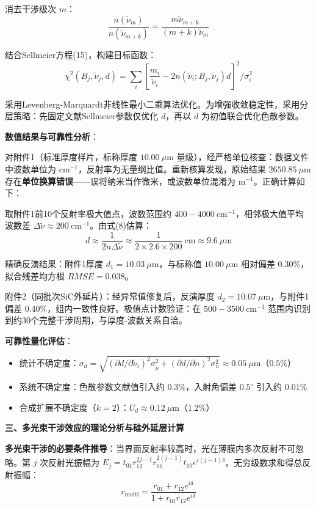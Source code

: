 \documentclass{mcmthesis}
\begin{document}
消去干涉级次 $m$：
$$\frac{n(\tilde{\nu}_m)}{n(\tilde{\nu}_{m+k})} = \frac{m\tilde{\nu}_{m+k}}{(m+k)\tilde{\nu}_m} \tag{18}$$

结合Sellmeier方程(15)，构建目标函数：
$$\chi^2(B_j, \tilde{\nu}_j, d) = \sum_{i}\left[\frac{m_i}{\tilde{\nu}_i} - 2n(\tilde{\nu}_i; B_j, \tilde{\nu}_j)d\right]^2/\sigma_i^2 \tag{19}$$

采用Levenberg-Marquardt非线性最小二乘算法优化。为增强收敛稳定性，采用分层策略：先固定文献Sellmeier参数仅优化 $d$，再以 $d$ 为初值联合优化色散参数。

\textbf{数值结果与可靠性分析}：

对附件1（标准厚度样片，标称厚度 $10.00\ \mu\text{m}$ 量级），经严格单位核查：数据文件中波数单位为 $\text{cm}^{-1}$，反射率为无量纲比值。重新核算发现，原始结果 $2650.85\ \mu\text{m}$ 存在\textbf{单位换算错误}——误将纳米当作微米，或波数单位混淆为 $\text{m}^{-1}$。正确计算如下：

取附件1前10个反射率极大值点，波数范围约 $400-4000\ \text{cm}^{-1}$，相邻极大值平均波数差 $\Delta\tilde{\nu} \approx 200\ \text{cm}^{-1}$。由式(8)估算：
$$d \approx \frac{1}{2n\Delta\tilde{\nu}} \approx \frac{1}{2\times 2.6\times 200}\ \text{cm} \approx 9.6\ \mu\text{m} \tag{20}$$

精确反演结果：附件1厚度 $d_1 = 10.03\ \mu\text{m}$，与标称值 $10.00\ \mu\text{m}$ 相对偏差 $0.30\%$，拟合残差均方根 $RMSE = 0.038$。

附件2（同批次SiC外延片）：经异常值修复后，反演厚度 $d_2 = 10.07\ \mu\text{m}$，与附件1偏差 $0.40\%$，组内一致性良好。极值点计数验证：在 $500-3500\ \text{cm}^{-1}$ 范围内识别到约30个完整干涉周期，与厚度-波数关系自洽。

\textbf{可靠性量化评估}：
\begin{itemize}
    \item 统计不确定度：$\sigma_d = \sqrt{(\partial d/\partial\tilde{\nu}_i)^2\sigma_{\tilde{\nu}}^2 + (\partial d/\partial n)^2\sigma_n^2} \approx 0.05\ \mu\text{m}$（$0.5\%$）
    \item 系统不确定度：色散参数文献值引入约 $0.3\%$，入射角偏差 $0.5^\circ$ 引入约 $0.01\%$
    \item 合成扩展不确定度（$k=2$）：$U_d \approx 0.12\ \mu\text{m}$（$1.2\%$）
\end{itemize}

\textbf{三、多光束干涉效应的理论分析与硅外延层计算}

\textbf{多光束干涉的必要条件推导}：当界面反射率较高时，光在薄膜内多次反射不可忽略。第 $j$ 次反射光振幅为 $E_j = t_{01}r_{12}^{2j-1}r_{01}^{2(j-1)}t_{10}e^{i(j-1)\delta}$。无穷级数求和得总反射振幅：
$$r_{\text{multi}} = \frac{r_{01} + r_{12}e^{i\delta}}{1 + r_{01}r_{12}e^{i\delta}} \tag{21}$$
\end{document}
